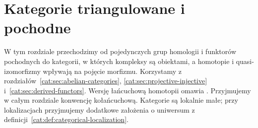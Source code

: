 \section{Kategorie triangulowane i pochodne}\label{cat:sec:triangulated-derived}
W tym rozdziale przechodzimy od pojedynczych grup homologii i funktorów pochodnych do kategorii, w których kompleksy są obiektami, a homotopie i quasi-izomorfizmy wpływają na pojęcie morfizmu. Korzystamy z rozdziałów~\ref{cat:sec:abelian-categories}, \ref{cat:sec:projective-injective} i~\ref{cat:sec:derived-functors}. Wersję łańcuchową homotopii omawia . Przyjmujemy w całym rozdziale konwencję kołańcuchową. Kategorie są lokalnie małe; przy lokalizacjach przyjmujemy dodatkowe założenia o uniwersum z definicji~\ref{cat:def:categorical-localization}.

